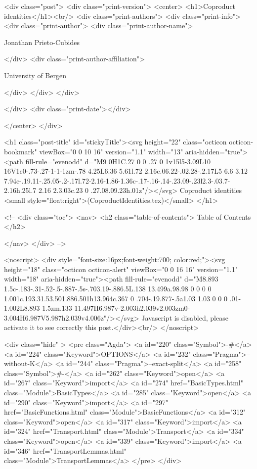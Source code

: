 <div class="post">
  <div class="print-version">
    <center>
      <h1>Coproduct identities</h1><br/>
        <div class="print-authors">
          <div class="print-info">
            <div class="print-author">
              <div class="print-author-name">
                
                  Jonathan Prieto-Cubides
                
              </div>
              <div class="print-author-affiliation">
                
                  University of Bergen
                
                </div>
            </div>
          </div>
          
          
        </div>
        <div class="print-date"></div>
        
        
    </center>
  </div>

  

  <h1 class="post-title" id="stickyTitle"><svg height="22" class="octicon octicon-bookmark" viewBox="0 0 10 16" version="1.1" width="13" aria-hidden="true"><path fill-rule="evenodd" d="M9 0H1C.27 0 0 .27 0 1v15l5-3.09L10 16V1c0-.73-.27-1-1-1zm-.78 4.25L6.36 5.61l.72 2.16c.06.22-.02.28-.2.17L5 6.6 3.12 7.94c-.19.11-.25.05-.2-.17l.72-2.16-1.86-1.36c-.17-.16-.14-.23.09-.23l2.3-.03.7-2.16h.25l.7 2.16 2.3.03c.23 0 .27.08.09.23h.01z"/></svg> Coproduct identities <small style="float:right">(CoproductIdentities.tex)</small>
  </h1>

  <!-- 
  <div class="toc">
    <nav>
    <h2 class="table-of-contents"> Table of Contents </h2>
      

    </nav>
  </div>
   -->

  <noscript>
  <div style="font-size:16px;font-weight:700; color:red;"><svg height="18" class="octicon octicon-alert" viewBox="0 0 16 16" version="1.1" width="18" aria-hidden="true"><path fill-rule="evenodd" d="M8.893 1.5c-.183-.31-.52-.5-.887-.5s-.703.19-.886.5L.138 13.499a.98.98 0 0 0 0 1.001c.193.31.53.501.886.501h13.964c.367 0 .704-.19.877-.5a1.03 1.03 0 0 0 .01-1.002L8.893 1.5zm.133 11.497H6.987v-2.003h2.039v2.003zm0-3.004H6.987V5.987h2.039v4.006z"/></svg> Javascript is disabled, please activate it to see correctly this post.</div><br/>
  </noscript>

  <div class="hide" >
<pre class="Agda">
<a id="220" class="Symbol">{-#</a> <a id="224" class="Keyword">OPTIONS</a> <a id="232" class="Pragma">--without-K</a> <a id="244" class="Pragma">--exact-split</a> <a id="258" class="Symbol">#-}</a>
<a id="262" class="Keyword">open</a> <a id="267" class="Keyword">import</a> <a id="274" href="BasicTypes.html" class="Module">BasicTypes</a>
<a id="285" class="Keyword">open</a> <a id="290" class="Keyword">import</a> <a id="297" href="BasicFunctions.html" class="Module">BasicFunctions</a>
<a id="312" class="Keyword">open</a> <a id="317" class="Keyword">import</a> <a id="324" href="Transport.html" class="Module">Transport</a>
<a id="334" class="Keyword">open</a> <a id="339" class="Keyword">import</a> <a id="346" href="TransportLemmas.html" class="Module">TransportLemmas</a>
</pre>
</div>

